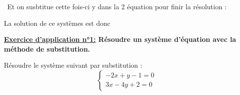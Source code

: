 \documentclass[12pt]{article}
\begin{document}
\vspace{0.5cm}
{\color{black!45}\dotfill}

\vspace{20pt}

\textbullet \ Et on susbtitue cette fois-ci y dans la 2 équation pour finir la résolution : 

\vspace{0.5cm}
{\color{black!45}\dotfill}

\vspace{0.5cm}
{\color{black!45}\dotfill}

\vspace{0.5cm}
{\color{black!45}\dotfill}

\vspace{20pt}

La solution de ce systèmes est donc {\color{black!45}\dotfill}

\vspace{20pt}
\begin{mdframed}[
    linewidth=1pt,
    roundcorner=5pt,
    linecolor=RoyalBlue,
    innertopmargin=10pt,
    innerbottommargin=10pt
]
{\color{RoyalBlue}
\textbf{\underline{Exercice d'application n°1:} Résoudre un système d'équation avec la méthode de substitution.}}

\vspace{5pt}
Résoudre le système suivant par substitution :
$$
\left\{
    \begin{array}{ll}
        -2x + y -1 = 0 \\
        3x - 4y +2 = 0
    \end{array}
\right.
$$

\vspace{0.5cm}
{\color{black!45}\dotfill}

\vspace{0.5cm}
{\color{black!45}\dotfill}

\vspace{0.5cm}
{\color{black!45}\dotfill}

\vspace{0.5cm}
{\color{black!45}\dotfill}

\vspace{0.5cm}
{\color{black!45}\dotfill}

\vspace{0.5cm}
{\color{black!45}\dotfill}

\vspace{20pt}

\end{mdframed}
\end{document}
